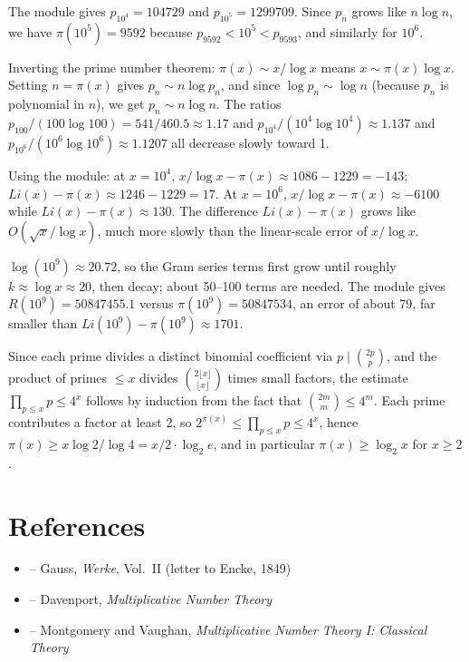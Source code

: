 \begin{solution}
The module gives $p_{10^4} = 104729$ and $p_{10^5} = 1299709$. Since $p_n$ grows like $n \log n$, we have $\pi(10^5) = 9592$ because $p_{9592} < 10^5 < p_{9593}$, and similarly for $10^6$.
\end{solution}

\begin{solution}
Inverting the prime number theorem: $\pi(x) \sim x/\log x$ means $x \sim \pi(x) \log x$. Setting $n = \pi(x)$ gives $p_n \sim n \log p_n$, and since $\log p_n \sim \log n$ (because $p_n$ is polynomial in $n$), we get $p_n \sim n \log n$. The ratios $p_{100}/(100 \log 100) = 541/460.5 \approx 1.17$ and $p_{10^4}/(10^4 \log 10^4) \approx 1.137$ and $p_{10^6}/(10^6 \log 10^6) \approx 1.1207$ all decrease slowly toward 1.
\end{solution}

\begin{solution}
Using the module: at $x = 10^4$, $x/\log x - \pi(x) \approx 1086 - 1229 = -143$; $Li(x) - \pi(x) \approx 1246 - 1229 = 17$. At $x = 10^6$, $x/\log x - \pi(x) \approx -6100$ while $Li(x) - \pi(x) \approx 130$. The difference $Li(x) - \pi(x)$ grows like $O(\sqrt{x}/\log x)$, much more slowly than the linear-scale error of $x/\log x$.
\end{solution}

\begin{solution}
$\log(10^9) \approx 20.72$, so the Gram series terms first grow until roughly $k \approx \log x \approx 20$, then decay; about 50--100 terms are needed. The module gives $R(10^9) = 50847455.1$ versus $\pi(10^9) = 50847534$, an error of about 79, far smaller than $Li(10^9) - \pi(10^9) \approx 1701$.
\end{solution}

\begin{solution}
Since each prime divides a distinct binomial coefficient via $p \mid \binom{2p}{p}$, and the product of primes $\le x$ divides $\binom{2\lfloor x \rfloor}{\lfloor x \rfloor}$ times small factors, the estimate $\prod_{p \le x} p \le 4^x$ follows by induction from the fact that $\binom{2m}{m} \le 4^m$. Each prime contributes a factor at least 2, so $2^{\pi(x)} \le \prod_{p \le x} p \le 4^x$, hence $\pi(x) \ge x \log 2 / \log 4 = x/2 \cdot \log_2 e$, and in particular $\pi(x) \ge \log_2 x$ for $x \ge 2$.
\end{solution}

\section{References}

\begin{itemize}
    \item \cite{gauss-works} -- Gauss, \textit{Werke}, Vol.~II (letter to Encke, 1849)
    \item \cite{davenport} -- Davenport, \textit{Multiplicative Number Theory}
    \item \cite{montgomery-vaughan} -- Montgomery and Vaughan, \textit{Multiplicative Number Theory I: Classical Theory}
\end{itemize}
